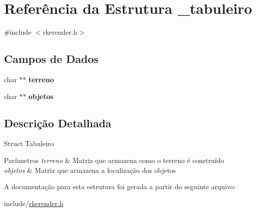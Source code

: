 \hypertarget{struct__tabuleiro}{\section{Referência da Estrutura \-\_\-tabuleiro}
\label{struct__tabuleiro}
}


{\ttfamily \#include $<$rkerender.\-h$>$}

\subsection*{Campos de Dados}
\begin{DoxyCompactItemize}
\item 
\hypertarget{struct__tabuleiro_a769a0d58682f084ffb749f2b7ab745a4}{char $\ast$$\ast$ {\bfseries terreno}}\label{struct__tabuleiro_a769a0d58682f084ffb749f2b7ab745a4}

\item 
\hypertarget{struct__tabuleiro_ab72c9e88a2e860a6183e6264189de9c3}{char $\ast$$\ast$ {\bfseries objetos}}\label{struct__tabuleiro_ab72c9e88a2e860a6183e6264189de9c3}

\end{DoxyCompactItemize}


\subsection{Descrição Detalhada}
Struct Tabuleiro 
\begin{DoxyParams}{Parâmetros}
{\em terreno} & Matriz que armazena como o terreno é construído \\
\hline
{\em objetos} & Matriz que armazena a localização dos objetos \\
\hline
\end{DoxyParams}


A documentação para esta estrutura foi gerada a partir do seguinte arquivo\-:\begin{DoxyCompactItemize}
\item 
include/\hyperlink{rkerender_8h}{rkerender.\-h}\end{DoxyCompactItemize}

